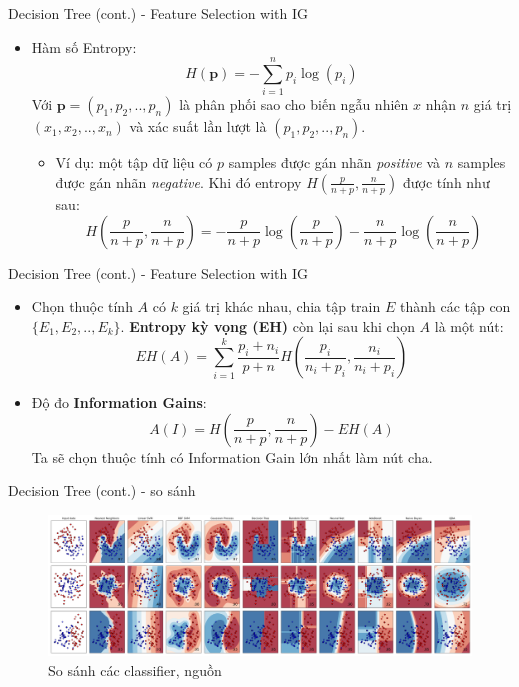 \documentclass[aspectratio=169,xcolor=dvipsnames]{beamer}
\begin{document}
\begin{frame}{Decision Tree (cont.) - Feature Selection with IG}
\begin{itemize}
\item Hàm số Entropy:
$$
H(\textbf{p}) = -\sum_{i = 1}^n p_i\log(p_i)
$$
Với $\textbf{p} = (p_1, p_2, .., p_n)$ là phân phối sao cho biến ngẫu nhiên $x$ nhận $n$ giá trị $(x_1, x_2, .., x_n)$ và xác suất lần lượt là $(p_1, p_2, .., p_n)$.

\begin{itemize}
\item Ví dụ: một tập dữ liệu có $p$ samples được gán nhãn \textit{positive} và $n$ samples được gán nhãn \textit{negative}. Khi đó entropy $H(\frac{p}{n + p}, \frac{n}{n + p})$ được tính như sau:
$$
H\left(\frac{p}{n + p}, \frac{n}{n + p}\right) = - \frac{p}{n + p}\log\left(\frac{p}{n + p}\right) - \frac{n}{n + p}\log\left(\frac{n}{n + p}\right)
$$
\end{itemize}
\end{itemize}
\end{frame}

\begin{frame}{Decision Tree (cont.) - Feature Selection with IG}
\begin{itemize}
\item Chọn thuộc tính $A$ có $k$ giá trị khác nhau, chia tập train $E$ thành các tập con $\{E_1, E_2, .., E_k\}$. \textbf{Entropy kỳ vọng (EH)} còn lại sau khi chọn $A$ là một nút:
$$
EH(A) = \sum_{i = 1}^{k} \frac{p_i + n_i}{p + n} H\left(\frac{p_i}{n_i + p_i}, \frac{n_i}{n_i + p_i}\right)
$$
\item Độ đo \textbf{Information Gains}:
$$
A(I) = H\left(\frac{p}{n + p}, \frac{n}{n + p}\right) - EH(A)
$$
Ta sẽ chọn thuộc tính có Information Gain lớn nhất làm nút cha.
\end{itemize}
\end{frame}

\begin{frame}{Decision Tree (cont.) - so sánh}
    \begin{figure}
        \centering
        \includegraphics[scale=.2]{img/classifiers-comparison.png}
        \caption{So sánh các classifier, nguồn \cite{scikit-learn}}
    \end{figure}
\end{frame}
\end{document}
